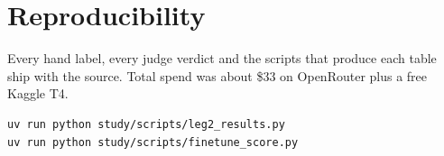 \documentclass[11pt]{article}
\begin{document}
\section*{Reproducibility}
Every hand label, every judge verdict and the scripts that produce each table ship with the source. Total spend was about \$33 on OpenRouter plus a free Kaggle T4.
\begin{lstlisting}
uv run python study/scripts/leg2_results.py
uv run python study/scripts/finetune_score.py
\end{lstlisting}



\end{document}
